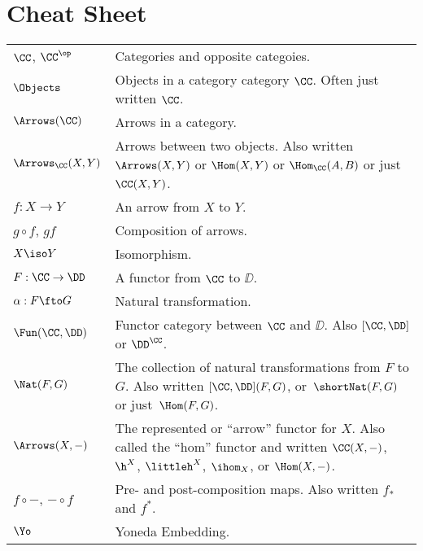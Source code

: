\section{Cheat Sheet}
\small
\renewcommand{\arraystretch}{1.1}
\begin{tabularx}{.9\linewidth}{l X}
$\CC$, $\CC^\op$ & Categories and opposite categoies. \\
$\Objects$ & Objects in a category category $\CC$. Often just written $\CC$.\\
$\Arrows(\CC)$ & Arrows in a category. \\
$\Arrows_\CC(X,Y)$ & Arrows between two objects.  Also written $\Arrows(X,Y)$ or
$\Hom(X,Y)$ or $\Hom_\CC(A, B)$ or just $\CC(X,Y)$. \\
$f: X \to Y$ & An arrow from $X$ to $Y$.\\
$g \circ f$, $gf$ & Composition of arrows.\\
$X \iso Y$ & Isomorphism.\\
$F:\CC \to\DD$ & A functor from $\CC$ to $\DD$.\\
$\alpha: F \fto G$ & Natural transformation.\\
$\Fun(\CC, \DD)$ & Functor category between $\CC$ and $\DD$. Also $[\CC,\DD]$ or
$\DD^\CC$.\\
$\Nat(F, G)$ & The collection of natural transformations from $F$ to $G$. Also written
$[\CC,\DD](F,G)$, or~$\shortNat(F,G)$ or just~$\Hom(F,G)$. \\
$\Arrows(X, -)$ & The represented or ``arrow'' functor for $X$. Also called the ``hom''
functor and written $\CC(X,-)$, $\h^X$, $\littleh^X$, $\ihom_X$, or $\Hom(X,-)$. \\
$f \circ - $, $- \circ f$ & Pre- and post-composition maps. Also written $f_*$ and
$f^*$.\\
$\Yo$ & Yoneda Embedding.\\
\end{tabularx}

\normalsize

